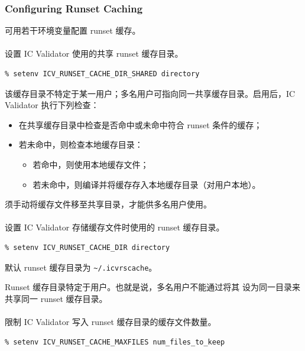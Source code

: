 \subsubsection*{Configuring Runset Caching}

可用若干环境变量配置 runset 缓存。

\paragraph{}
设置 IC Validator 使用的共享 runset 缓存目录。
\begin{lstlisting}
% setenv ICV_RUNSET_CACHE_DIR_SHARED directory
\end{lstlisting}

该缓存目录不特定于某一用户；多名用户可指向同一共享缓存目录。启用后，IC Validator 执行下列检查：
\begin{itemize}
  \item 在共享缓存目录中检查是否命中或未命中符合 runset 条件的缓存；
  \item 若未命中，则检查本地缓存目录：
  \begin{itemize}
    \item 若命中，则使用本地缓存文件；
    \item 若未命中，则编译并将缓存存入本地缓存目录（对用户本地）。
  \end{itemize}
\end{itemize}
须手动将缓存文件移至共享目录，才能供多名用户使用。

\paragraph{}
设置 IC Validator 存储缓存文件时使用的 runset 缓存目录。
\begin{lstlisting}
% setenv ICV_RUNSET_CACHE_DIR directory
\end{lstlisting}

默认 runset 缓存目录为 \texttt{\textasciitilde/.icvrscache}。

Runset 缓存目录特定于用户。也就是说，多名用户不能通过将其  设为同一目录来共享同一 runset 缓存目录。

\paragraph{}
限制 IC Validator 写入 runset 缓存目录的缓存文件数量。
\begin{lstlisting}
% setenv ICV_RUNSET_CACHE_MAXFILES num_files_to_keep
\end{lstlisting}

